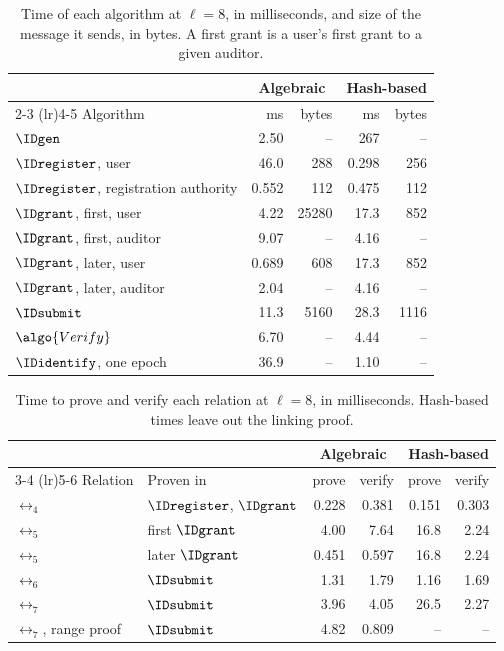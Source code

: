 \begin{table}[htbp] \centering \small
  \begin{tabular}{l r r r r} \toprule
    & \multicolumn{2}{c}{Algebraic} & \multicolumn{2}{c}{Hash-based} \\
    \cmidrule(lr){2-3} \cmidrule(lr){4-5}
    Algorithm & ms & bytes & ms & bytes \\
    \midrule
    $\IDgen$ & 2.50 & -- & 267 & -- \\
    $\IDregister$, user & 46.0 & 288 & 0.298 & 256 \\
    $\IDregister$, registration authority & 0.552 & 112 & 0.475 & 112 \\
    $\IDgrant$, first, user & 4.22 & 25280 & 17.3 & 852 \\
    $\IDgrant$, first, auditor & 9.07 & -- & 4.16 & -- \\
    $\IDgrant$, later, user & 0.689 & 608 & 17.3 & 852 \\
    $\IDgrant$, later, auditor & 2.04 & -- & 4.16 & -- \\
    $\IDsubmit$ & 11.3 & 5160 & 28.3 & 1116 \\
    $\algo{Verify}$ & 6.70 & -- & 4.44 & -- \\
    $\IDidentify$, one epoch & 36.9 & -- & 1.10 & -- \\
  \bottomrule \end{tabular}
\caption[Tracing: time and message size of every algorithm]{Time of each
algorithm at $\ell = 8$, in milliseconds, and size of the message it sends, in
bytes. A first grant is a user's first grant to a given auditor.}
\label{tab:txid-protocol}
%
\end{table}

\begin{table}[htbp] \centering \small
  \begin{tabular}{l l r r r r} \toprule
    & & \multicolumn{2}{c}{Algebraic} & \multicolumn{2}{c}{Hash-based} \\
    \cmidrule(lr){3-4} \cmidrule(lr){5-6}
    Relation & Proven in & prove & verify & prove & verify \\
    \midrule
    $\rel_4$ & $\IDregister$, $\IDgrant$ & 0.228 & 0.381 & 0.151 & 0.303 \\
    $\rel_5$ & first $\IDgrant$ & 4.00 & 7.64 & 16.8 & 2.24 \\
    $\rel_5$ & later $\IDgrant$ & 0.451 & 0.597 & 16.8 & 2.24 \\
    $\rel_6$ & $\IDsubmit$ & 1.31 & 1.79 & 1.16 & 1.69 \\
    $\rel_7$ & $\IDsubmit$ & 3.96 & 4.05 & 26.5 & 2.27 \\
    $\rel_7$, range proof & $\IDsubmit$ & 4.82 & 0.809 & -- & -- \\
  \bottomrule \end{tabular}
\caption[Tracing: time of every proof]{Time to prove and verify each relation
at $\ell = 8$, in milliseconds. Hash-based times leave out the linking proof.} \label{tab:txid-relations}
%
\end{table}

